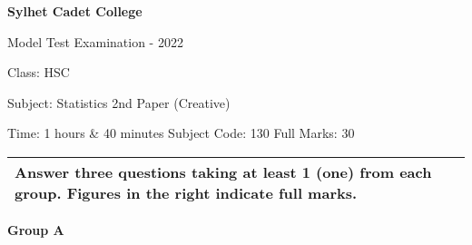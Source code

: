\documentclass{article}
\begin{document}
\begin{center}
  \bfseries\large
  Sylhet Cadet College

\normalsize
  Model Test Examination - 2022

  Class: HSC

  Subject: Statistics 2nd Paper (Creative)

  Time: 1 hours \& 40 minutes \qquad \qquad Subject Code: 130  \qquad  \qquad Full Marks: 30

\end{center}

\noindent
\begin{tabular}{p{\dimexpr\linewidth-2\tabcolsep}}
  Answer three questions taking at least 1 (one) from each group. Figures in the right indicate full marks.\\
  \hline
\end{tabular}

\begin{center}
\textbf{Group A}
\end{center}
\end{document}
